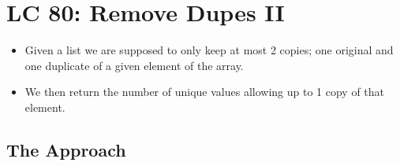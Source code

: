 \documentclass{article}
\begin{document}
\section*{LC 80: Remove Dupes II} 
	\begin{itemize}
		\item Given a list we are supposed to only keep at most 2 copies; one original and one duplicate of a given element of the array.  
		\item We then return the number of unique values allowing up to 1 copy of that element. 
	\end{itemize}
\subsection{The Approach}
\end{document}
